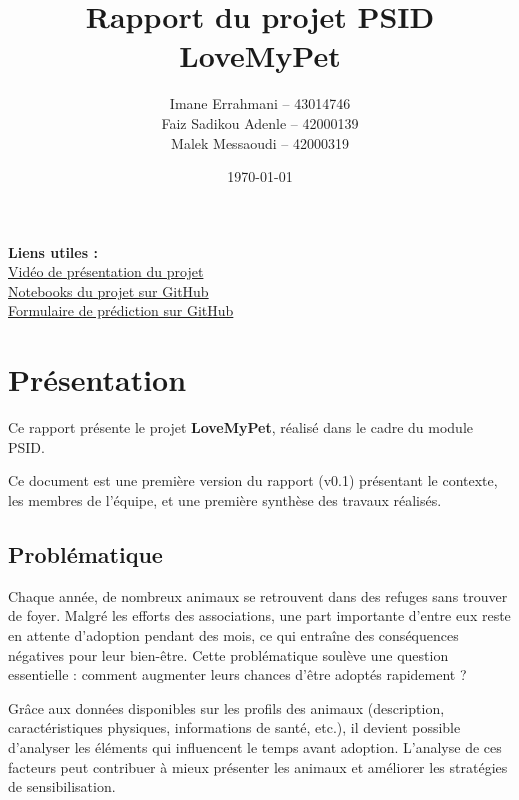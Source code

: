 \documentclass[a4paper,12pt]{article}
\title{\textbf{Rapport du projet PSID }\\ \Large LoveMyPet}
\author{
    Imane Errahmani -- 43014746 \\
    Faiz Sadikou Adenle -- 42000139 \\
    Malek Messaoudi -- 42000319
}
\date{\today}
\begin{document}
\maketitle

\vspace{1cm}  %
\begin{center}
    \textbf{Liens utiles :}\\[0.5cm]
    \href{https://youtu.be/XL3DGk36d_4}{Vidéo de présentation du projet}\\[0.3cm]
    \href{https://github.com/malek62-info/lovemypet_psid/tree/PSID_ML}{Notebooks du projet sur GitHub}\\[0.3cm]
    \href{https://github.com/malek62-info/lovemypet_psid/tree/formulaire-ai}{Formulaire de prédiction sur GitHub}
\end{center}

\thispagestyle{empty}
\clearpage  %

\tableofcontents
\thispagestyle{empty}
\clearpage

\section {Présentation}

Ce rapport présente le projet \textbf{LoveMyPet}, réalisé dans le cadre du module PSID.

Ce document est une première version du rapport (v0.1) présentant le contexte, les membres de l’équipe, et une première synthèse des travaux réalisés.

\subsection {Problématique}

Chaque année, de nombreux animaux se retrouvent dans des refuges sans trouver de foyer. Malgré les efforts des associations, une part importante d’entre eux reste en attente d’adoption pendant des mois, ce qui entraîne des conséquences négatives pour leur bien-être. Cette problématique soulève une question essentielle : comment augmenter leurs chances d’être adoptés rapidement ?

Grâce aux données disponibles sur les profils des animaux (description, caractéristiques physiques, informations de santé, etc.), il devient possible d’analyser les éléments qui influencent le temps avant adoption. L’analyse de ces facteurs peut contribuer à mieux présenter les animaux et améliorer les stratégies de sensibilisation.
\end{document}
